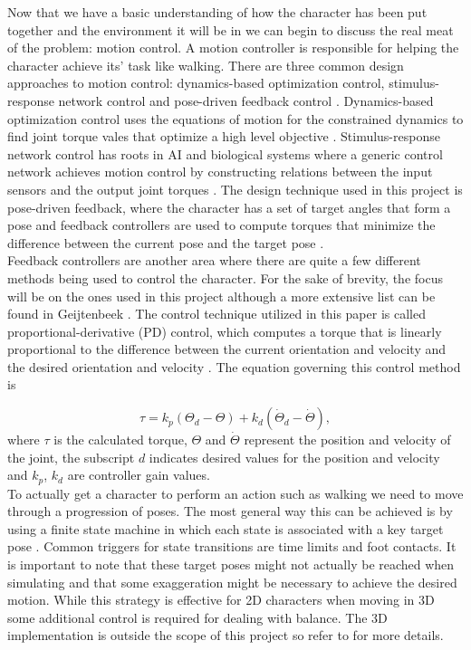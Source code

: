 \documentclass[12pt, a4paper]{article}
\begin{document}
Now that we have a basic understanding of how the character has been put together and the environment it will be in we can begin to discuss the real meat of the problem: motion control. A motion controller is responsible for helping the character achieve its' task like walking. There are three common design approaches to motion control: dynamics-based optimization control, stimulus-response network control and pose-driven feedback control \cite{Geijtenbeek}. Dynamics-based optimization control uses the equations of motion for the constrained dynamics to find joint torque vales that optimize a high level objective \cite{dynamics_control}. Stimulus-response network control has roots in AI and biological systems where a generic control network achieves motion control by constructing relations between the input sensors and the output joint torques \cite{Geijtenbeek}. The design technique used in this project is pose-driven feedback, where the character has a set of target angles that form a pose and feedback controllers are used to compute torques that minimize the difference between the current pose and the target pose \cite{walking_survey}. \\

Feedback controllers are another area where there are quite a few different methods being used to control the character. For the sake of brevity, the focus will be on the ones used in this project although a more extensive list can be found in Geijtenbeek \cite{Geijtenbeek}. The control technique utilized in this paper is called proportional-derivative (PD) control, which computes a torque that is linearly proportional to the difference between the current orientation and velocity and the desired orientation and velocity \cite{walking_survey}. The equation governing this control method is 

\begin{equation}
\tau = k_p(\Theta_d - \Theta) + k_d(\dot\Theta_d -\dot\Theta),
\label{eqn: pd control}
\end{equation} 
\noindent
where $\tau$ is the calculated torque, $\Theta$ and $\dot\Theta$ represent the position and velocity of the joint, the subscript $d$ indicates desired values for the position and velocity and $k_p$, $k_d$ are controller gain values.\\

To actually get a character to perform an action such as walking we need to move through a progression of poses. The most general way this can be achieved is by using a finite state machine in which each state is associated with a key target pose \cite{Geijtenbeek}. Common triggers for state transitions are time limits and foot contacts. It is important to note that these target poses might not actually be reached when simulating and that some exaggeration might be necessary to achieve the desired motion. While this strategy is effective for 2D characters when moving in 3D some additional control is required for dealing with balance. The 3D implementation is outside the scope of this project so refer to \cite{Yin07} for more details.  
\end{document}
